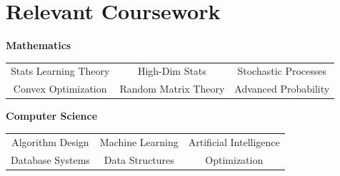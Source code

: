 \section{\sc Relevant Coursework}

\noindent \textbf{Mathematics}\\
\begin{tabular}{ccc}
    Stats Learning Theory & High-Dim Stats & Stochastic Processes \\
    Convex Optimization & Random Matrix Theory & Advanced Probability

\end{tabular}

\noindent \textbf{Computer Science}\\
\begin{tabular}{ccc}
         Algorithm Design & Machine Learning & Artificial Intelligence  \\
     Database Systems & Data Structures & Optimization
\end{tabular}